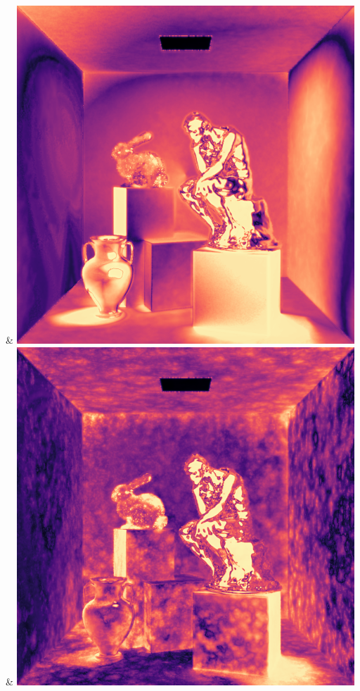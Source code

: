 & \includegraphics[width=\linewidth]{figures/py/tests/batch_size/5+nrc+pt+14@4_1spp_flip.png}
& \includegraphics[width=\linewidth]{figures/py/tests/batch_size/25+nrc+pt+14@4_1spp_flip.png}

